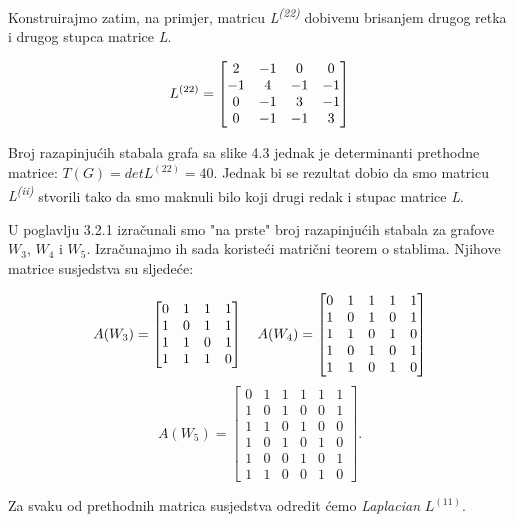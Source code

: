 \documentclass[times, utf8, zavrsni]{fer}
\begin{document}
Konstruirajmo zatim, na primjer, matricu \textit{L\textsuperscript{(22)}} dobivenu brisanjem drugog retka i drugog stupca matrice \textit{L}.

\[
\centering
L^{(22)} = 
\begin{bmatrix}
	2 & -1 & 0 & 0 \\
	-1 & 4 & -1 & -1 \\
	0 & -1 & 3 & -1 \\
	0 & -1 & -1 & 3
\end{bmatrix}
\]

Broj razapinjućih stabala grafa sa slike 4.3 jednak je determinanti prethodne matrice: $T(G) = det L^{(22)} = 40$. Jednak bi se rezultat dobio da smo matricu \textit{L\textsuperscript{(ii)}} stvorili tako da smo maknuli bilo koji drugi redak i stupac matrice \textit{L}.

U poglavlju 3.2.1 izračunali smo "na prste" broj razapinjućih stabala za grafove $W_3$, $W_4$ i $W_5$. Izračunajmo ih sada koristeći matrični teorem o stablima. Njihove matrice susjedstva su sljedeće:

\[
\centering
A(W_3) = 
\begin{bmatrix}
	0 & 1 & 1 & 1 \\
	1 & 0 & 1 & 1 \\
	1 & 1 & 0 & 1 \\
	1 & 1 & 1 & 0
\end{bmatrix}
\quad
A(W_4) =
\begin{bmatrix}
	0 & 1 & 1 & 1 & 1 \\
	1 & 0 & 1 & 0 & 1\\
	1 & 1 & 0 & 1 & 0 \\
	1 & 0 & 1 & 0 & 1 \\
	1 & 1 & 0 & 1 & 0
\end{bmatrix}
\]
\[
A(W_5) =
\begin{bmatrix}
	0 & 1 & 1 & 1 & 1 & 1 \\
	1 & 0 & 1 & 0 & 0 & 1 \\
	1 & 1 & 0 & 1 & 0 & 0 \\
	1 & 0 & 1 & 0 & 1 & 0 \\
	1 & 0 & 0 & 1 & 0 & 1 \\
	1 & 1 & 0 & 0 & 1 & 0
\end{bmatrix}.
\]

Za svaku od prethodnih matrica susjedstva odredit ćemo \textit{Laplacian} $L^{(11)}$.
\end{document}
